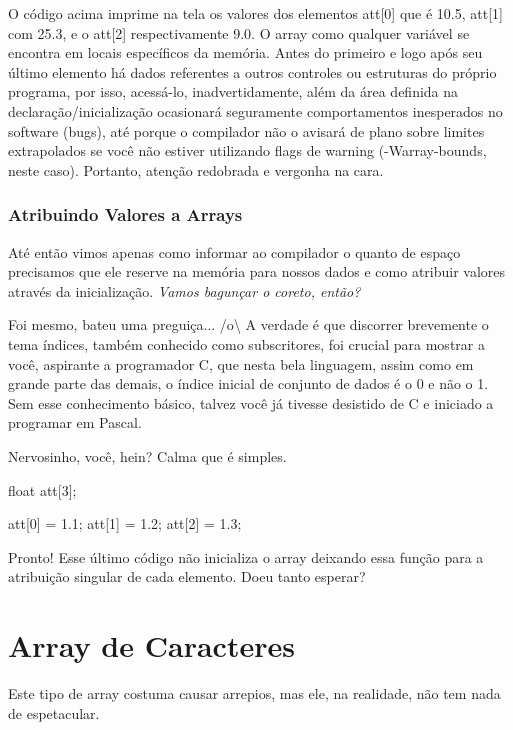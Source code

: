 O código acima imprime na tela os valores dos elementos att[0] que é 10.5, att[1] com 25.3, e o att[2] respectivamente 9.0. O array como qualquer variável se encontra em locais específicos da memória. Antes do primeiro e logo após seu último elemento há dados referentes a outros controles ou estruturas do próprio programa, por isso, acessá-lo, inadvertidamente, além da área definida na declaração/inicialização ocasionará seguramente comportamentos inesperados no software (bugs), até porque o compilador não o avisará de plano sobre limites extrapolados se você não estiver utilizando flags de warning (-Warray-bounds, neste caso). Portanto, atenção redobrada e vergonha na cara.

\subsubsection{Atribuindo Valores a Arrays}
Até então vimos apenas como informar ao compilador o quanto de espaço precisamos que ele reserve na memória para nossos dados e como atribuir valores através da inicialização. \textit{Vamos bagunçar o coreto, então?}


Foi mesmo, bateu uma preguiça... /o{\textbackslash} A verdade é que discorrer brevemente o tema índices, também conhecido como subscritores, foi crucial para mostrar a você, aspirante a programador C, que nesta bela linguagem, assim como em grande parte das demais, o índice inicial de conjunto de dados é o 0 e não o 1. Sem esse conhecimento básico, talvez você já tivesse desistido de C e iniciado a programar em Pascal.


Nervosinho, você, hein? Calma que é simples.

\begin{ccode}
  float att[3];

  att[0] = 1.1;
  att[1] = 1.2;
  att[2] = 1.3;
\end{ccode}

Pronto! Esse último código não inicializa o array deixando essa função para a atribuição singular de cada elemento. Doeu tanto esperar?

\section{Array de Caracteres}
Este tipo de array costuma causar arrepios, mas ele, na realidade, não tem nada de espetacular.

